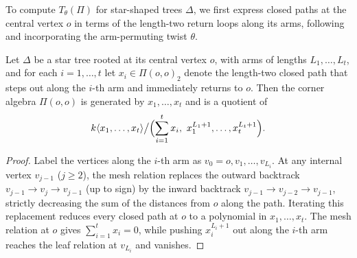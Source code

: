 To compute $T_\theta(\Pi)$ for star-shaped trees $\Delta$, we first express closed paths at the central vertex $o$ in terms of the length-two return loops along its arms, following~\cite[Sections~11.3 and~13.1]{Schedler} and incorporating the arm-permuting twist $\theta$.

\begin{lemma}
\label{lem:star-return-reduction}
Let $\Delta$ be a star tree rooted at its central vertex $o$, with arms of lengths $L_1,\ldots,L_t$, and for each $i=1,\ldots,t$ let $x_i\in\Pi(o,o)_2$ denote the length-two closed path that steps out along the $i$-th arm and immediately returns to $o$. Then the corner algebra $\Pi(o,o)$ is generated by $x_1,\ldots,x_t$ and is a quotient of
\begin{equation}
  k\langle x_1,\ldots,x_t\rangle\big/\Bigl(\sum_{i=1}^t x_i,\ x_1^{L_1+1},\ldots,x_t^{L_t+1}\Bigr).
  \label{eq:star-corner-presentation}
\end{equation}
\end{lemma}
\begin{proof}
Label the vertices along the $i$-th arm as $v_0=o,v_1,\ldots,v_{L_i}$. At any internal vertex $v_{j-1}$ ($j\geq2$), the mesh relation replaces the outward backtrack $v_{j-1}\to v_j\to v_{j-1}$ (up to sign) by the inward backtrack $v_{j-1}\to v_{j-2}\to v_{j-1}$, strictly decreasing the sum of the distances from $o$ along the path. Iterating this replacement reduces every closed path at $o$ to a polynomial in $x_1,\ldots,x_t$. The mesh relation at $o$ gives $\sum_{i=1}^t x_i=0$, while pushing $x_i^{L_i+1}$ out along the $i$-th arm reaches the leaf relation at $v_{L_i}$ and vanishes.
\end{proof}

